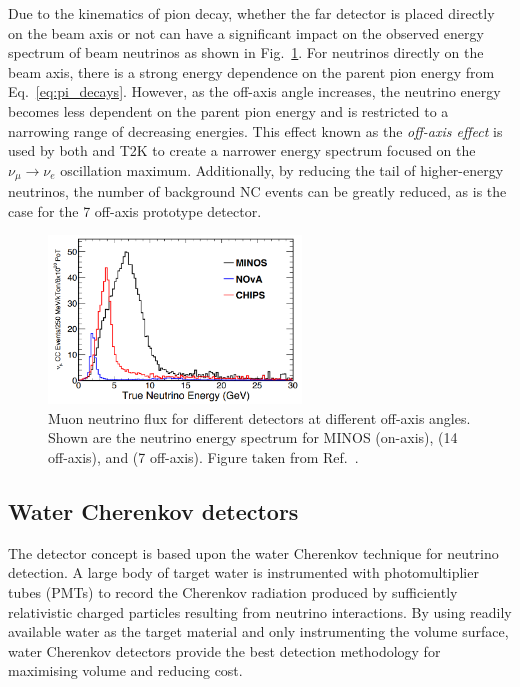 Due to the kinematics of pion decay, whether the far detector is placed directly on the beam axis
or not can have a significant impact on the observed energy spectrum of beam neutrinos as shown in
Fig.~\ref{fig:numi_axis}. For neutrinos directly on the beam axis, there is a strong energy
dependence on the parent pion energy from Eq.~\ref{eq:pi_decays}. However, as the off-axis angle
increases, the neutrino energy becomes less dependent on the parent pion energy and is restricted
to a narrowing range of decreasing energies. This effect known as the \emph{off-axis effect} is
used by both \nova and T2K to create a narrower energy spectrum focused on the
$\nu_{\mu}\rightarrow\nu_{e}$ oscillation maximum. Additionally, by reducing the tail of
higher-energy neutrinos, the number of background NC events can be greatly reduced, as is the case
for the \unit{7}{} off-axis \chipsfive prototype detector.

\begin{figure} %
    \includegraphics[width=0.6\textwidth]{diagrams/4-chips/numi_axis.png}
    \caption[Muon neutrino flux for different \numi detectors at different off-axis angles.]
    {Muon neutrino flux for different \numi detectors at different off-axis angles. Shown are the
        neutrino energy spectrum for MINOS (on-axis), \nova (\unit{14}{} off-axis),
        and \chipsfive (\unit{7}{} off-axis). Figure taken from
        Ref.~\cite{adamson2013}.}
    \label{fig:numi_axis}
\end{figure}

\subsection{Water Cherenkov detectors} %
\label{sec:chips_concept_cherenkov} %

The \chips detector concept is based upon the water Cherenkov technique for neutrino detection. A
large body of target water is instrumented with photomultiplier tubes (PMTs) to record the
Cherenkov radiation produced by sufficiently relativistic charged particles resulting from
neutrino interactions. By using readily available water as the target material and only
instrumenting the volume surface, water Cherenkov detectors provide the best detection methodology
for maximising volume and reducing cost.


